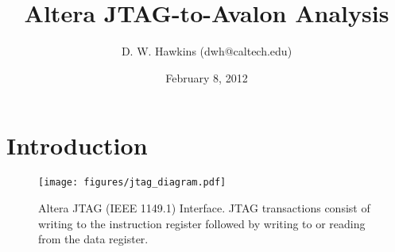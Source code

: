 \documentclass[10pt,twoside]{article}
\begin{document}
\title{Altera JTAG-to-Avalon Analysis}
\author{D. W. Hawkins (dwh@caltech.edu)}
\date{February 8, 2012}
\maketitle

\thispagestyle{empty}

\tableofcontents

\cleardoublepage

\pagestyle{fancy}
\chead{}
\rhead{\today}
\lfoot{}
\cfoot{}
\rfoot{\thepage}
\renewcommand{\headrulewidth}{0.4pt}
\renewcommand{\footrulewidth}{0.4pt}

\lstset{language=Tcl}

\section{Introduction}

%
\begin{figure}
  \begin{center}
    \texttt{[image: figures/jtag\_diagram.pdf]}
  \end{center}
  \caption{Altera JTAG (IEEE 1149.1) Interface. JTAG transactions
  consist of writing to the instruction register followed by
  writing to or reading from the data register.}
  \label{fig:jtag_diagram}
\end{figure}
\end{document}
